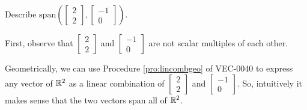 \documentclass{ximera}
\begin{document}
\begin{example}\label{ex:spanr2}
Describe $\mbox{span}\left(\begin{bmatrix}2\\2\end{bmatrix}, \begin{bmatrix}-1\\0\end{bmatrix}\right)$.
\begin{explanation}
First, observe that $\begin{bmatrix}2\\2\end{bmatrix}$ and $\begin{bmatrix}-1\\0\end{bmatrix}$ are not scalar multiples of each other.  

\begin{center}
\end{center}


Geometrically, we can use Procedure \ref{pro:lincombgeo} of VEC-0040 to express any vector of $\mathbb{R}^2$ as a linear combination of $\begin{bmatrix}2\\2\end{bmatrix}$ and  $\begin{bmatrix}-1\\0\end{bmatrix}$.  So, intuitively it makes sense that the two vectors span all of $\mathbb{R}^2$.


\end{explanation}
\end{example}
\end{document}
